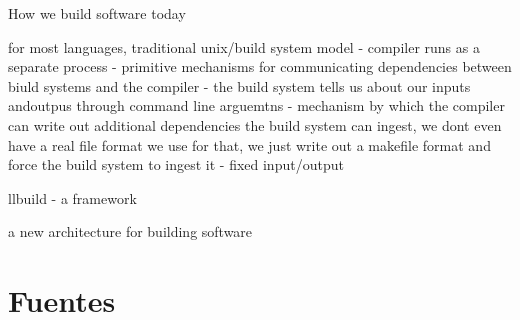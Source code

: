 \documentclass[12pt, a4paper]{report}
\begin{document}
How we build software today

for most languages, traditional unix/build system model
- compiler runs as a separate process
- primitive mechanisms for communicating dependencies between biuld systems and the compiler
  - the build system tells us about our inputs andoutpus through command line arguemtns
  - mechanism by which the compiler can write out additional dependencies the build system can ingest, we dont even have a real file format we use for that, we just write out a makefile format and force the build system to ingest it
  - fixed input/output

llbuild - a framework

a new architecture for building software

\section*{Fuentes}
\end{document}
